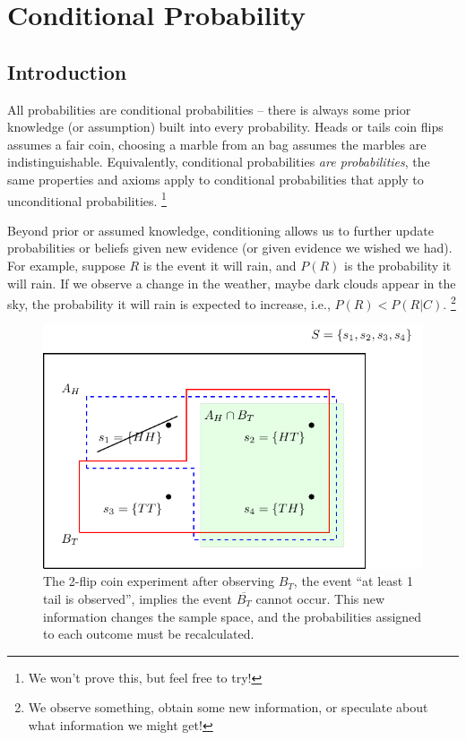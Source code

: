


\maketitle
\clearpage

\section{Conditional Probability}

\subsection{Introduction}

All probabilities are conditional probabilities 
-- there is always some prior knowledge (or assumption) built 
into every probability. 
Heads or tails coin flips assumes a fair coin, 
choosing a marble from an bag assumes the marbles are indistinguishable.
Equivalently, 
conditional probabilities \emph{are probabilities}, 
the same properties and axioms apply to conditional probabilities that apply
to unconditional probabilities.%
\footnote{We won't prove this, but feel free to try!}

Beyond prior or assumed knowledge, 
conditioning allows us to further update probabilities 
or beliefs given new evidence (or given evidence we wished we had). 
For example, 
suppose \(R\) is the event it will rain, 
and \(P(R)\) is the probability it will rain. 
If we observe a change in the weather, 
maybe dark clouds appear in the sky, 
the probability it will rain is expected to increase,
i.e., \(P(R) < P(R|C)\).%
\footnote{We observe something, 
obtain some new information, 
or speculate about what information we might get!}

\begin{figure}[h!]
\centering
\includegraphics[width=0.75\linewidth]{tikz/figure1.pdf}
\caption{%
The 2-flip coin experiment after observing \(B_{T}\), 
the event ``at least 1 tail is observed'', 
implies the event \(\overline{B_{T}}\) cannot occur.
This new information changes the sample space, 
and the probabilities assigned to each outcome must be recalculated.%
}
\label{fig:conditioning}
\end{figure}

